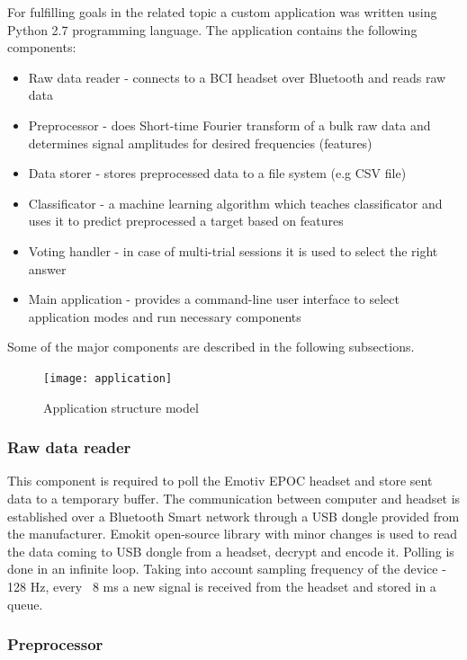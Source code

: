 \documentclass[12pt]{article}
\begin{document}
For fulfilling goals in the related topic a custom application was written using Python 2.7 programming language. The application contains the following components:
\begin{itemize}
\item Raw data reader - connects to a BCI headset over Bluetooth and reads raw data
\item Preprocessor -  does Short-time Fourier transform of a bulk raw data and determines signal amplitudes for desired frequencies (features)
\item Data storer - stores preprocessed data to a file system (e.g CSV file)
\item Classificator - a machine learning algorithm which teaches classificator and uses it to predict preprocessed a target based on features
\item Voting handler - in case of multi-trial sessions it is used to select the right answer
\item Main application - provides a command-line user interface to select application modes and run necessary components
\end{itemize}

Some of the major components are described in the following subsections.
\begin{figure} [ht]
\begin{center}
\texttt{[image: application]}
\caption{Application structure model}
\label{fig:fnCompModel}
\end{center}
\end{figure}

\subsubsection{Raw data reader}

This component is required to poll the Emotiv EPOC headset and store sent data to a temporary buffer. The communication between computer and headset is established over a Bluetooth Smart network through a USB dongle provided from the manufacturer. Emokit\cite{emokit} open-source library with minor changes is used to read the data coming to USB dongle from a headset, decrypt and encode it. Polling is done in an infinite loop. Taking into account sampling frequency of the device - 128 Hz, every ~8 ms a new signal is received from the headset and stored in a queue.

\subsubsection{Preprocessor}
\end{document}
